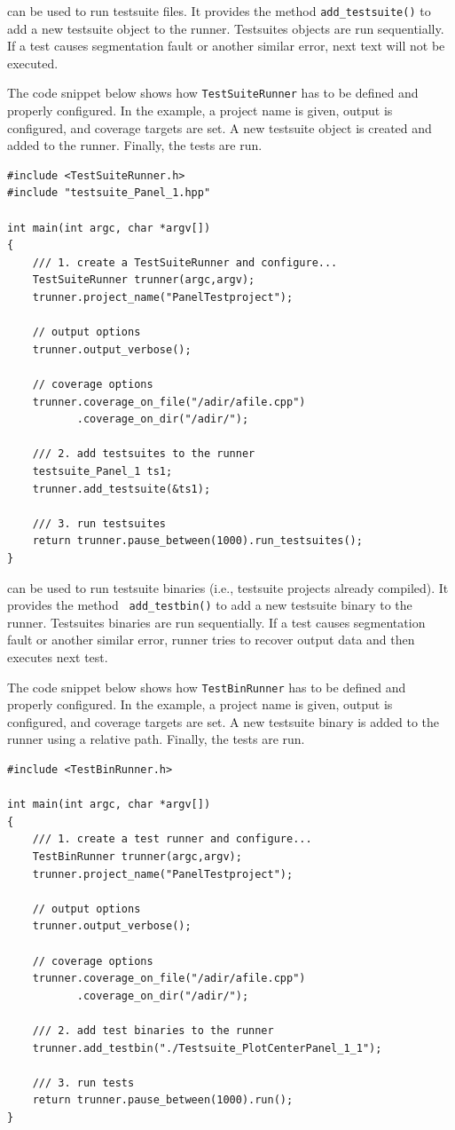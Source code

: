 \newpage

 can be used to run testsuite files. It
provides the method {\tt add\_testsuite()} to add a new testsuite
object to the runner. Testsuites objects are run sequentially. If a
test causes segmentation fault or another similar error, next text
will not be executed.

The code snippet below shows how {\tt TestSuiteRunner} has to be
defined and properly configured. In the example, a project name is
given, output is configured, and coverage targets are set. A new
testsuite object is created and added to the runner. Finally, the
tests are run. 

\begin{lstlisting}
#include <TestSuiteRunner.h>
#include "testsuite_Panel_1.hpp"

int main(int argc, char *argv[])
{
    /// 1. create a TestSuiteRunner and configure...
    TestSuiteRunner trunner(argc,argv);
    trunner.project_name("PanelTestproject");

    // output options
    trunner.output_verbose();

    // coverage options
    trunner.coverage_on_file("/adir/afile.cpp")
           .coverage_on_dir("/adir/");

    /// 2. add testsuites to the runner
    testsuite_Panel_1 ts1;
    trunner.add_testsuite(&ts1);

    /// 3. run testsuites
    return trunner.pause_between(1000).run_testsuites();
}
\end{lstlisting}



\newpage


 can be used to run testsuite binaries (i.e.,
testsuite projects already compiled). It provides the method {\tt
  add\_testbin()} to add a new testsuite binary to the
runner. Testsuites binaries are run sequentially. If a test causes
segmentation fault or another similar error, runner tries to recover
output data and then executes next test.

The code snippet below shows how {\tt TestBinRunner} has to be defined
and properly configured. In the example, a project name is given,
output is configured, and coverage targets are set. A new testsuite
binary is added to the runner using a relative path. Finally, the
tests are run.


\begin{lstlisting}
#include <TestBinRunner.h>

int main(int argc, char *argv[])
{
    /// 1. create a test runner and configure...
    TestBinRunner trunner(argc,argv);
    trunner.project_name("PanelTestproject");

    // output options
    trunner.output_verbose();

    // coverage options
    trunner.coverage_on_file("/adir/afile.cpp")
           .coverage_on_dir("/adir/");

    /// 2. add test binaries to the runner
    trunner.add_testbin("./Testsuite_PlotCenterPanel_1_1");

    /// 3. run tests
    return trunner.pause_between(1000).run();
}
\end{lstlisting}


